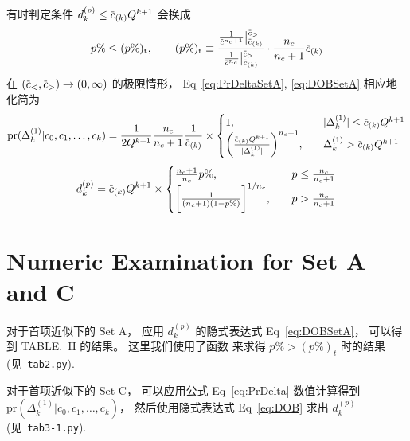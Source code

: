 \documentclass[12pt]{article}
\newcommand*\dmspr{\textrm{pr}}
\newcommand*\dmsvat[3][\big]{#1|_{\raise3pt\hbox{$\scriptstyle#2$}}^{\lower3pt\hbox{$\scriptstyle#3$}}}
\def\dmscbar{\dmsbar{c}}
\def\dmsccck{c_0,c_1,\ldots,c_k}
\def\dmsdeltako{\Delta_k^{(1)}}
\def\dmsdkp{d_k^{(p)}}
\begin{document}
有时判定条件 $\dmsdkp\le\dmscbar_{(k)}Q^{k+1}$ 会换成
\begin{equation}
  p\%\le(p\%)_{\textrm{t}},
  \qquad (p\%)_{\textrm{t}}\equiv
  \frac{\frac{1}{\dmscbar^{n_c+1}}\dmsvat{\dmscbar_{(k)}}{\dmscbar_>}}{
    \frac{1}{\dmscbar^{n_c}}\dmsvat{\dmscbar_{(k)}}{\dmscbar_>}}
  \cdot \frac{n_c}{n_c+1}\dmscbar_{(k)}
\end{equation}
在 $(\dmscbar_<,\dmscbar_>)\to(0,\infty)$ 的极限情形，
Eq~\eqref{eq:PrDeltaSetA}, \eqref{eq:DOBSetA} 相应地化简为
\begin{equation}
  \dmspr(\dmsdeltako|\dmsccck)= \frac{1}{2Q^{k+1}} \frac{n_c}{n_c+1}
  \frac{1}{\dmscbar_{(k)}}\times
  \begin{cases}
    1,&\quad |\dmsdeltako|\le\dmscbar_{(k)}Q^{k+1}\\
    \biggl( \frac{\dmscbar_{(k)}Q^{k+1}}{|\dmsdeltako|}\biggr)^{n_c+1},
    &\quad \dmsdeltako > \dmscbar_{(k)}Q^{k+1}
  \end{cases}
\end{equation}
\begin{equation}
  \dmsdkp = \dmscbar_{(k)}Q^{k+1}\times
  \begin{cases}
    \frac{n_c+1}{n_c}p\%,
    &\quad p\le \frac{n_c}{n_c+1}\\
    \biggl[ \frac{1}{(n_c+1)(1-p\%)}\biggr]^{1/n_c},
    &\quad p > \frac{n_c}{n_c+1}
  \end{cases}
\end{equation}

\section{Numeric Examination for Set A and C}
对于首项近似下的 Set A，
应用 $\dmsdkp$ 的隐式表达式 Eq~\eqref{eq:DOBSetA}，
可以得到 TABLE.~II 的结果。
这里我们使用了函数 
来求得 $p\%>(p\%)_t$ 时的结果
(见~\texttt{tab2.py}).

对于首项近似下的 Set C，
可以应用公式 Eq~\eqref{eq:PrDelta} 数值计算得到 $\dmspr(\dmsdeltako|
\dmsccck)$，
然后使用隐式表达式 Eq~\eqref{eq:DOB} 求出 $\dmsdkp$
(见~\texttt{tab3-1.py}).
\end{document}
